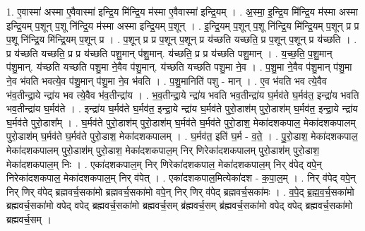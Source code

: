 \documentclass[17pt]{extarticle}
\begin{document}
1. ए॒वास्मा॑ अस्मा ए॒वैवास्मा॑ इन्द्रि॒य मि॑न्द्रि॒य म॑स्मा ए॒वैवास्मा॑ इन्द्रि॒यम् । . अ॒स्मा॒ इ॒न्द्रि॒य मि॑न्द्रि॒य म॑स्मा अस्मा इन्द्रि॒यम् प॒शून् प॒शू नि॑न्द्रि॒य म॑स्मा अस्मा इन्द्रि॒यम् प॒शून् । . इ॒न्द्रि॒यम् प॒शून् प॒शू नि॑न्द्रि॒य मि॑न्द्रि॒यम् प॒शून् प्र प्र प॒शू नि॑न्द्रि॒य मि॑न्द्रि॒यम् प॒शून् प्र । . प॒शून् प्र प्र प॒शून् प॒शून् प्र य॑च्छति यच्छति॒ प्र प॒शून् प॒शून् प्र य॑च्छति । . प्र य॑च्छति यच्छति॒ प्र प्र य॑च्छति पशु॒मान् प॑शु॒मान्. य॑च्छति॒ प्र प्र य॑च्छति पशु॒मान् । . य॒च्छ॒ति॒ प॒शु॒मान् प॑शु॒मान्. य॑च्छति यच्छति पशु॒मा ने॒वैव प॑शु॒मान्. य॑च्छति यच्छति पशु॒मा ने॒व । . प॒शु॒मा ने॒वैव प॑शु॒मान् प॑शु॒मा ने॒व भ॑वति भवत्ये॒व प॑शु॒मान् प॑शु॒मा ने॒व भ॑वति । . प॒शु॒मानिति॑ पशु - मान् । . ए॒व भ॑वति भव त्ये॒वैव भ॑व॒तीन्द्रा॒ये न्द्रा॑य भव त्ये॒वैव भ॑व॒तीन्द्रा॑य । . भ॒व॒तीन्द्रा॒ये न्द्रा॑य भवति भव॒तीन्द्रा॑य घ॒र्मव॑ते घ॒र्मव॑त॒ इन्द्रा॑य भवति भव॒तीन्द्रा॑य घ॒र्मव॑ते । . इन्द्रा॑य घ॒र्मव॑ते घ॒र्मव॑त॒ इन्द्रा॒ये न्द्रा॑य घ॒र्मव॑ते पुरो॒डाश॑म् पुरो॒डाश॑म् घ॒र्मव॑त॒ इन्द्रा॒ये न्द्रा॑य घ॒र्मव॑ते पुरो॒डाश᳚म् । . घ॒र्मव॑ते पुरो॒डाश॑म् पुरो॒डाश॑म् घ॒र्मव॑ते घ॒र्मव॑ते पुरो॒डाश॒ मेका॑दशकपाल॒ मेका॑दशकपालम् पुरो॒डाश॑म् घ॒र्मव॑ते घ॒र्मव॑ते पुरो॒डाश॒ मेका॑दशकपालम् । . घ॒र्मव॑त॒ इति॑ घ॒र्म - व॒ते॒ । . पु॒रो॒डाश॒ मेका॑दशकपाल॒ मेका॑दशकपालम् पुरो॒डाश॑म् पुरो॒डाश॒ मेका॑दशकपाल॒म् निर् णिरेका॑दशकपालम् पुरो॒डाश॑म् पुरो॒डाश॒ मेका॑दशकपाल॒म् निः । . एका॑दशकपाल॒म् निर् णिरेका॑दशकपाल॒ मेका॑दशकपाल॒म् निर् व॑पेद् वपे॒न् निरेका॑दशकपाल॒ मेका॑दशकपाल॒म् निर् व॑पेत् । . एका॑दशकपाल॒मित्येका॑दश - क॒पा॒ल॒म् । . निर् व॑पेद् वपे॒न् निर् णिर् व॑पेद् ब्रह्मवर्च॒सका॑मो ब्रह्मवर्च॒सका॑मो वपे॒न् निर् णिर् व॑पेद् ब्रह्मवर्च॒सका॑मः । . व॒पे॒द् ब्र॒ह्म॒व॒र्च॒सका॑मो ब्रह्मवर्च॒सका॑मो वपेद् वपेद् ब्रह्मवर्च॒सका॑मो ब्रह्मवर्च॒सम् ब्र॑ह्मवर्च॒सम् ब्र॑ह्मवर्च॒सका॑मो वपेद् वपेद् ब्रह्मवर्च॒सका॑मो ब्रह्मवर्च॒सम् । \newline
\end{document}
